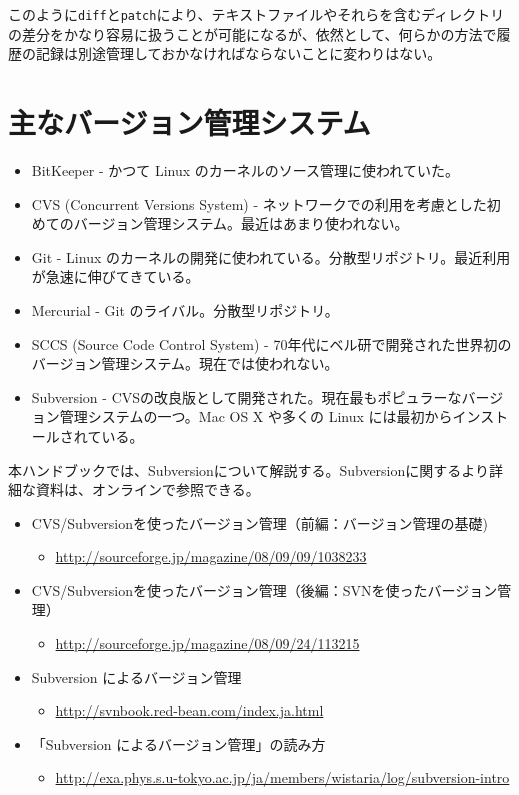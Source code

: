 このように{\tt diff}と{\tt patch}により、テキストファイルやそれらを含むディレクトリの差分をかなり容易に扱うことが可能になるが、依然として、何らかの方法で履歴の記録は別途管理しておかなければならないことに変わりはない。

\section{主なバージョン管理システム}

\begin{itemize}
\item BitKeeper - かつて Linux のカーネルのソース管理に使われていた。
\item CVS (Concurrent Versions System) - ネットワークでの利用を考慮とした初めてのバージョン管理システム。最近はあまり使われない。
\item Git - Linux のカーネルの開発に使われている。分散型リポジトリ。最近利用が急速に伸びてきている。
\item Mercurial - Git のライバル。分散型リポジトリ。
\item SCCS (Source Code Control System) - 70年代にベル研で開発された世界初のバージョン管理システム。現在では使われない。
\item Subversion - CVSの改良版として開発された。現在最もポピュラーなバージョン管理システムの一つ。Mac OS X や多くの Linux には最初からインストールされている。
\end{itemize}
本ハンドブックでは、Subversionについて解説する。Subversionに関するより詳細な資料は、オンラインで参照できる。
\begin{itemize}
\item CVS/Subversionを使ったバージョン管理（前編：バージョン管理の基礎)
  \begin{itemize}
  \item \url{http://sourceforge.jp/magazine/08/09/09/1038233}
  \end{itemize}
\item CVS/Subversionを使ったバージョン管理（後編：SVNを使ったバージョン管理）
  \begin{itemize}
  \item \url{http://sourceforge.jp/magazine/08/09/24/113215}
  \end{itemize}
\item Subversion によるバージョン管理
  \begin{itemize}
  \item \url{http://svnbook.red-bean.com/index.ja.html}
  \end{itemize}
\item 「Subversion によるバージョン管理」の読み方
  \begin{itemize}
  \item \url{http://exa.phys.s.u-tokyo.ac.jp/ja/members/wistaria/log/subversion-intro}
  \end{itemize}
\end{itemize}
